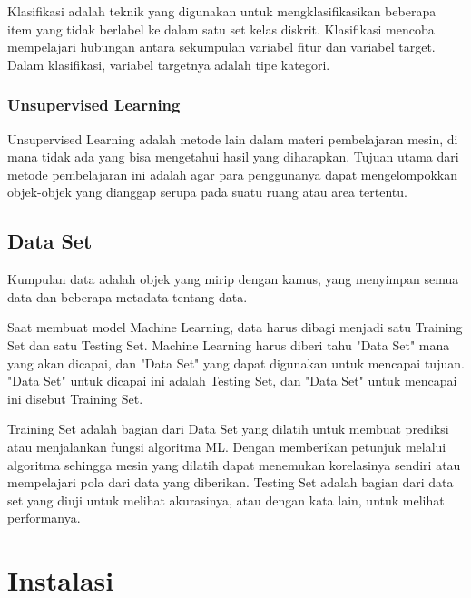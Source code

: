 \par Klasifikasi adalah teknik yang digunakan untuk mengklasifikasikan beberapa item yang tidak berlabel ke dalam satu set kelas diskrit. Klasifikasi mencoba mempelajari hubungan antara sekumpulan variabel fitur dan variabel target. Dalam klasifikasi, variabel targetnya adalah tipe kategori.

\subsubsection{Unsupervised Learning}

\par Unsupervised Learning adalah metode lain dalam materi pembelajaran mesin, di mana tidak ada yang bisa mengetahui hasil yang diharapkan. Tujuan utama dari metode pembelajaran ini adalah agar para penggunanya dapat mengelompokkan objek-objek yang dianggap serupa pada suatu ruang atau area tertentu.\cite{unsuper}

\subsection{Data Set}

\par Kumpulan data adalah objek yang mirip dengan kamus, yang menyimpan semua data dan beberapa metadata tentang data.\cite{scikit} 

\par Saat membuat model Machine Learning, data harus dibagi menjadi satu Training Set dan satu Testing Set. Machine Learning harus diberi tahu "Data Set" mana yang akan dicapai, dan "Data Set" yang dapat digunakan untuk mencapai tujuan. "Data Set" untuk dicapai ini adalah Testing Set, dan "Data Set" untuk mencapai ini disebut Training Set.\cite{dataset}

\par Training Set adalah bagian dari Data Set yang dilatih untuk membuat prediksi atau menjalankan fungsi algoritma ML. Dengan memberikan petunjuk melalui algoritma sehingga mesin yang dilatih dapat menemukan korelasinya sendiri atau mempelajari pola dari data yang diberikan. Testing Set adalah bagian dari data set yang diuji untuk melihat akurasinya, atau dengan kata lain, untuk melihat performanya.\cite{traintest}

\section{Instalasi}


